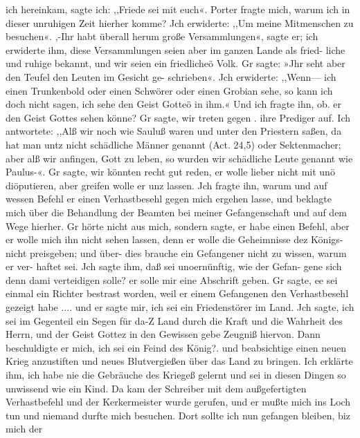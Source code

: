 ich hereinkam, sagte ich: ,,Friede sei mit euch«. Porter fragte
mich, warum ich in dieser unruhigen Zeit hierher komme? Jch
erwiderte: ,,Um meine Mitmenschen zu besuchen«. ,-Ihr habt
überall herum große Versammlungen«, sagte er; ich erwiderte
ihm, diese Versammlungen seien aber im ganzen Lande als fried-
liche und ruhige bekannt, und wir seien ein friedlicheö Volk. Gr
sagte: »Jhr seht aber den Teufel den Leuten im Gesicht ge-
schrieben«. Jch erwiderte: ,,Wenn— ich einen Trunkenbold oder
einen Schwörer oder einen Grobian sehe, so kann ich doch nicht
sagen, ich sehe den Geist Gotteö in ihm.« Und ich fragte ihn, ob.
er den Geist Gottes sehen könne? Gr sagte, wir treten gegen .
ihre Prediger auf. Ich antwortete: ,,Alß wir noch wie Sauluß waren
und unter den Priestern saßen, da hat man untz nicht schädliche
Männer genannt (Act. 24,5) oder Sektenmacher; aber alß wir
anfingen, Gott zu leben, so wurden wir schädliche Leute genannt
wie Paulus-«. Gr sagte, wir könnten recht gut reden, er wolle
lieber nicht mit unö diöputieren, aber greifen wolle er unz lassen. Jch
fragte ihn, warum und auf wessen Befehl er einen Verhastbesehl
gegen mich ergehen lasse, und beklagte mich über die Behandlung
der Beamten bei meiner Gefangenschaft und auf dem Wege
hierher. Gr hörte nicht aus mich, sondern sagte, er habe einen
Befehl, aber er wolle mich ihn nicht sehen lassen, denn er
wolle die Geheimnisse dez Königs- nicht preisgeben; und über-
dies brauche ein Gefangener nicht zu wissen, warum er ver-
haftet sei. Jch sagte ihm, daß sei unoernünftig, wie der Gefan-
gene sich denn dami verteidigen solle? er solle mir eine Abschrift
geben. Gr sagte, ee sei einmal ein Richter bestrast worden, weil
er einem Gefangenen den Verhastbesehl gezeigt habe .... und
er sagte mir, ich sei ein Friedenstörer im Land. Jch sagte, ich
sei im Gegenteil ein Segen für da-Z Land durch die Kraft und
die Wahrheit des Herrn, und der Geist Gottez in den Gewissen
gebe Zeugniß hiervon. Dann beschuldigte er mich, ich sei ein
Feind des König?. und beabsichtige einen neuen Krieg anzustiften
und neues Blutvergießen über das Land zu bringen. Ich erklärte
ihm, ich habe nie die Gebräuche des Kriegeß gelernt und sei in
diesen Dingen so unwissend wie ein Kind. Da kam der Schreiber
mit dem außgefertigten Verhastbefehl und der Kerkermeister wurde
gerufen, und er mußte mich ins Loch tun und niemand durfte
mich besuchen. Dort sollte ich nun gefangen bleiben, biz mich der


